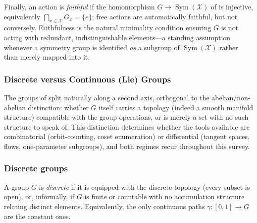 \documentclass[mathematics,review,submit,moreauthors]{Definitions/mdpi}
\begin{document}
Finally, an action is \emph{faithful} if the homomorphism
$G \to \operatorname{Sym}(\mathcal{X})$ of  is injective,
equivalently $\bigcap_{x \in \mathcal{X}} G_x = \{e\}$; free actions are automatically
faithful, but not conversely. Faithfulness is the natural minimality
condition ensuring $G$ is not acting with redundant, indistinguishable
elements---a standing assumption whenever a symmetry group is identified
\emph{as} a subgroup of $\operatorname{Sym}(\mathcal{X})$ rather than merely mapped into it.





\subsubsection{Discrete versus Continuous (Lie) Groups}
\label{subsec:discrete-vs-lie}

The groups of  split naturally along a second axis,
orthogonal to the abelian/non-abelian distinction: whether $G$ itself carries
a topology (indeed a smooth manifold structure) compatible with the group
operations, or is merely a set with no such structure to speak of. This
distinction determines whether the tools available are combinatorial
(orbit-counting, coset enumeration) or differential (tangent spaces, flows,
one-parameter subgroups), and both regimes recur throughout this survey.

\subsubsection{Discrete groups}
\label{subsubsec:discrete-groups}

\begin{Definition}
\label{def:discrete-group}
A group $G$ is \emph{discrete} if it is equipped with the discrete topology
(every subset is open), or, informally, if $G$ is finite or countable with
no accumulation structure relating distinct elements. Equivalently, the only
continuous paths $\gamma : [0,1] \to G$ are the constant ones.
\end{Definition}
\end{document}
